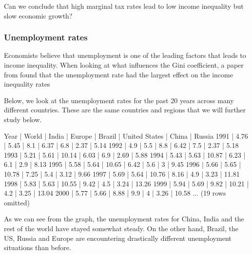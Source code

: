 \documentclass[letterpaper,10pt,english]{jupyterBook}
\begin{document}
\sphinxAtStartPar
Can we conclude that high marginal tax rates lead to low income inequality but slow economic growth?


\subsubsection{Unemployment rates}
\label{\detokenize{content/06-inequality/historical-inequality:unemployment-rates}}
\sphinxAtStartPar
Economists believe that unemployment is one of the leading factors that leads to income inequality. When looking at what influences the Gini coefficient, a paper from  found that the unemployment rate had the largest effect on the income inequality rates

\sphinxAtStartPar
Below, we look at the unemployment rates for the past 20 years across many different countries. These are the same countries and regions that we will further study below.

\begin{sphinxVerbatim}[commandchars=\\\{\}]
  
\end{sphinxVerbatim}

\begin{sphinxVerbatim}[commandchars=\\\{\}]
Year | World | India | Europe | Brazil | United States | China | Russia
1991 | 4.76  | 5.45  | 8.1    | 6.37   | 6.8           | 2.37  | 5.14
1992 | 4.9   | 5.5   | 8.8    | 6.42   | 7.5           | 2.37  | 5.18
1993 | 5.21  | 5.61  | 10.14  | 6.03   | 6.9           | 2.69  | 5.88
1994 | 5.43  | 5.63  | 10.87  | 6.23   | 6.1           | 2.9   | 8.13
1995 | 5.58  | 5.64  | 10.65  | 6.42   | 5.6           | 3     | 9.45
1996 | 5.66  | 5.65  | 10.78  | 7.25   | 5.4           | 3.12  | 9.66
1997 | 5.69  | 5.64  | 10.76  | 8.16   | 4.9           | 3.23  | 11.81
1998 | 5.83  | 5.63  | 10.55  | 9.42   | 4.5           | 3.24  | 13.26
1999 | 5.94  | 5.69  | 9.82   | 10.21  | 4.2           | 3.25  | 13.04
2000 | 5.77  | 5.66  | 8.88   | 9.9    | 4             | 3.26  | 10.58
... (19 rows omitted)
\end{sphinxVerbatim}

\sphinxAtStartPar
As we can see from the graph, the unemployment rates for China, India and the rest of the world have stayed somewhat steady. On the other hand, Brazil, the US, Russia and Europe are encountering drastically different unemployment situations than before.
\end{document}
